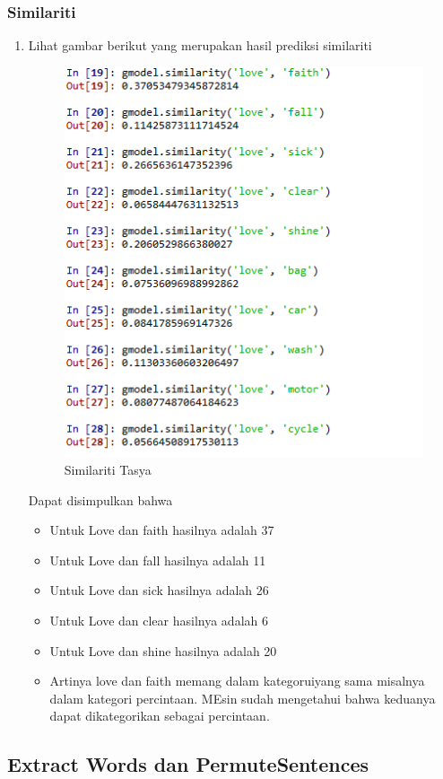 \subsubsection{Similariti}
\begin{enumerate}
\item Lihat gambar berikut yang merupakan hasil prediksi similariti
\begin{figure}[ht]
\centering
\includegraphics[scale=0.3]{figures/chapter5tasya17.png}
\caption{Similariti Tasya}
\label{Praktek}
\end{figure}

Dapat disimpulkan bahwa
\begin{itemize}
\item Untuk Love dan faith hasilnya adalah 37%
\item Untuk Love dan fall hasilnya adalah 11%
\item Untuk Love dan sick hasilnya adalah 26%
\item Untuk Love dan clear hasilnya adalah 6%
\item Untuk Love dan shine hasilnya adalah 20%
\item Artinya love dan faith memang dalam kategoruiyang sama misalnya dalam kategori percintaan. MEsin sudah mengetahui bahwa keduanya dapat dikategorikan sebagai percintaan.
\end{itemize}
\end{enumerate}

\subsection{Extract Words dan PermuteSentences}
